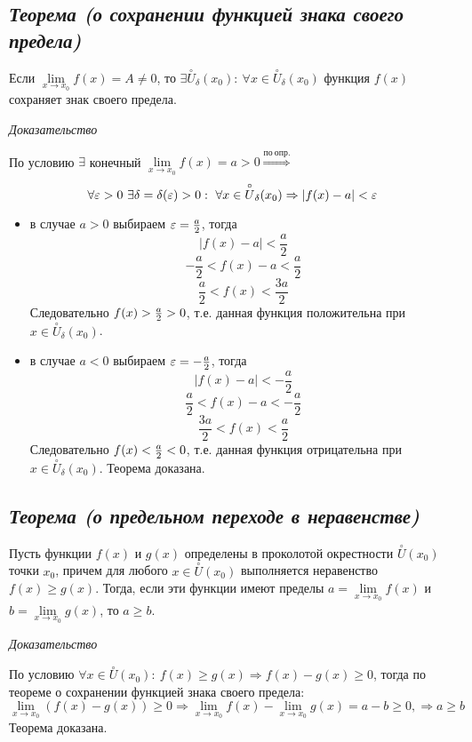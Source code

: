 \subsection{\textit{Теорема (о сохранении функцией знака своего предела)}}

Если $\lim\limits_{x \to x_0} f(x) = A \neq 0$, то $\exists \overset{\circ}U_\delta(x_0): \ \forall x \in \overset{\circ}U_\delta(x_0)$ функция $f(x)$ сохраняет знак своего предела.

\textit{Доказательство}

По условию $\exists$ конечный $\lim\limits_{x \to x_0} f(x) = a > 0 \overset{по\ опр.}{\Rightarrow}$ $$\forall {\large\varepsilon} > 0 \ \exists\delta=\delta({\large\varepsilon} )>0: \ \forall x \in \overset{\circ}U_\delta(x_0) \Rightarrow | f(x) - a|  < {\large\varepsilon}$$
\begin{itemize}

\item в случае $a > 0$ выбираем ${\large\varepsilon} = {\Large\frac{a}{2}}$, тогда $$| f(x) - a|  < {\frac{a}{2}}$$ $$-{\frac{a}{2}}< f(x) - a < {\frac{a}{2}}$$ $${\frac{a}{2}}< f(x) < {\frac{3a}{2}}$$ Следовательно $f(x) > {\Large\frac{a}{2}}>0$, т.е. данная функция положительна при $x \in \overset{\circ}U_\delta(x_0)$.
\item в случае $a < 0$ выбираем ${\large\varepsilon} = -{\Large\frac{a}{2}}$, тогда $$| f(x) - a|  < - {\frac{a}{2}}$$ $${\frac{a}{2}}< f(x) - a < -{\frac{a}{2}}$$ $${\frac{3a}{2}}< f(x) < {\frac{a}{2}}$$ Следовательно $f(x) < {\Large\frac{a}{2}}< 0$, т.е. данная функция отрицательна при $x \in \overset{\circ}U_\delta(x_0)$. Теорема доказана.

\end{itemize}
\subsection{\textit{Теорема (о предельном переходе в неравенстве)}}

Пусть функции $f(x)$ и $g(x)$ определены в проколотой окрестности $\overset{\circ}U(x_0)$ точки $x_0$, причем для любого $x \in \overset{\circ}U(x_0)$ выполняется неравенство $f(x) \geqslant g(x)$. Тогда, если эти функции имеют пределы $a = \lim\limits_{x \to x_0}f(x)$ и $b = \lim\limits_{x \to x_0}g(x)$, то $a \geqslant b$.

\textit{Доказательство}

По условию $\forall x \in \overset{\circ}U(x_0): \ f(x) \geqslant g(x) \Rightarrow f(x) - g(x) \geqslant 0$, тогда по теореме о сохранении функцией знака своего предела: $$\lim\limits_{x \to x_0}(f(x) - g(x)) \geqslant 0 \Rightarrow \lim\limits_{x \to x_0}f(x) - \lim\limits_{x \to x_0}g(x) = a - b \geqslant 0, \Rightarrow a \geqslant b$$ Теорема доказана.
